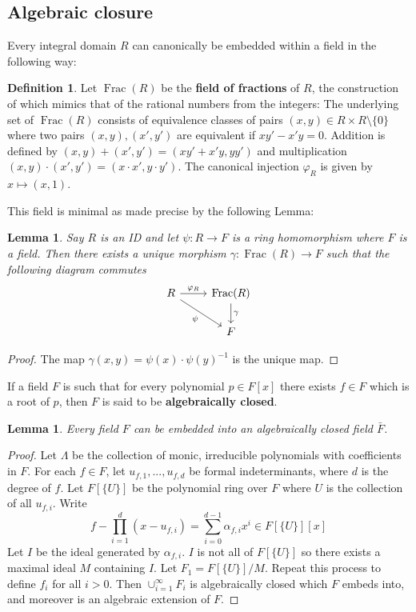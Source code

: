 \documentclass[12pt]{article}
\theoremstyle{plain}
\newtheorem{lemma}[thm]{Lemma}
\theoremstyle{definition}
\newtheorem{defn}[thm]{Definition} %
\begin{document}
	\subsection{Algebraic closure}
	\label{sec:fieldextensions}%
	Every integral domain $R$ can canonically be embedded within a field in the following way:
	\begin{defn}
		Let $\operatorname{Frac}(R)$ be the \textbf{field of fractions} of $R$, the construction of which mimics that of the rational numbers from the integers: The underlying set of $\operatorname{Frac}(R)$ consists of equivalence classes of pairs $(x,y) \in R\times R\setminus\lbrace 0 \rbrace$ where two pairs $(x,y),(x',y')$ are equivalent if $xy' - x'y = 0$. Addition is defined by $(x,y) + (x',y') = (xy' + x'y,yy')$ and multiplication $(x,y)\cdot(x',y') = (x\cdot x',y\cdot y')$. The canonical injection $\varphi_R$ is given by $x \mapsto (x,1)$.
	\end{defn}
	This field is minimal as made precise by the following Lemma:
	\begin{lemma}
		\label{uniquenessoffff}
		Say $R$ is an ID and let $\psi: R \to F$ is a ring homomorphism where $F$ is a field. Then there exists a unique morphism $\gamma: \operatorname{Frac}(R) \to F$ such that the following diagram commutes
		\[
		\begin{tikzcd}
			R\arrow[r,"{\varphi_R}"]\arrow[dr,swap,"{\psi}"] & \operatorname{Frac}(R)\arrow[d,"{\gamma}"]\\
			& F
		\end{tikzcd}
		\]
	\end{lemma}
	\begin{proof}
		The map $\gamma(x,y) = \psi(x)\cdot\psi(y)^{-1}$ is the unique map.
	\end{proof}
	If a field $F$ is such that for every polynomial $p \in F[x]$ there exists $f \in F$ which is a root of $p$, then $F$ is said to be \textbf{algebraically closed}.
	\begin{lemma}
		\label{algebraicclosure}
		Every field $F$ can be embedded into an algebraically closed field $\bar{F}$.
	\end{lemma}
	\begin{proof}
		Let $\Lambda$ be the collection of monic, irreducible polynomials with coefficients in $F$. For each $f \in F$, let $u_{f,1},...,u_{f,d}$ be formal indeterminants, where $d$ is the degree of $f$. Let $F[\lbrace U\rbrace]$ be the polynomial ring over $F$ where $U$ is the collection of all $u_{f,i}$. Write
		\[f - \prod_{i = 1}^d(x - u_{f,i}) = \sum_{i = 0}^{d-1}\alpha_{f,i}x^i \in F[\lbrace U \rbrace][x]\]
		Let $I$ be the ideal generated by $\alpha_{f,i}$. $I$ is not all of $F[\lbrace U \rbrace]$ so there exists a maximal ideal $M$ containing $I$. Let $F_1 = F[\lbrace U \rbrace]/M$. Repeat this process to define $f_i$ for all $i > 0$. Then $\cup_{i = 1}^\infty F_i$ is algebraically closed which $F$ embeds into, and moreover is an algebraic extension of $F$.
	\end{proof}
\end{document}
